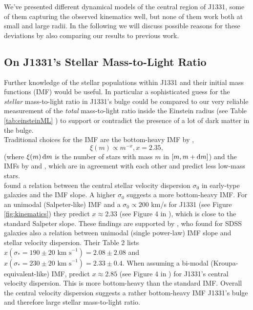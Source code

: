 We've presented different dynamical models of the central region of J1331, some of them capturing the observed kinematics well, but none of them work both at small and large radii. In the following we will discuss possible reasons for these deviations by also comparing our results to previous work.

\subsection{On J1331's Stellar Mass-to-Light Ratio} \label{sec:MLdiscussion}

Further knowledge of the stellar populations within J1331 and their initial mass functions (IMF) would be useful. In particular a sophisticated guess for the \emph{stellar} mass-to-light ratio in J1331's bulge could be compared to our very reliable measurement of the \emph{total} mass-to-light ratio inside the Einstein radius (see Table \ref{tab:einsteinML} ) to support or contradict the presence of a lot of dark matter in the bulge. \\

Traditional choices for the IMF are the bottom-heavy IMF by \citet{Salpeter1955},
$$\xi(m) \propto m^{-x}, x=2.35,$$
(where $\xi(m) \mathop{}\!\mathrm{d} m$ is the number of stars with mass $m$ in $[m,m+\mathop{}\!\mathrm{d} m]$) and the IMFs by \citet{2002Sci...295...82K} and \citet{Chabrier2003}, which are in agreement with each other and predict less low-mass stars. \\

\citet{Ferreras} found a relation between the central stellar velocity dispersion $\sigma_0$ in early-type galaxies and the IMF slope. A higher $\sigma_0$ suggests a more bottom-heavy IMF. For an unimodal (Salpeter-like) IMF and a $\sigma_0 \propto 200 $ km/s for J1331 (see Figure \ref{fig:kinematics}) they predict $x \approx 2.33$ (see Figure 4 in \citet{Ferreras}), which is close to the standard Salpeter slope. These findings are supported by \citet{2014MNRAS.438.1483S}, who found for SDSS galaxies also a relation between unimodal (single power-law) IMF slope and stellar velocity dispersion. Their Table 2 lists $x(\sigma_*=190 \pm 20 \text{ km s}^{-1}) = 2.08 \pm 2.08$ and $x(\sigma_*= 230 \pm 20 \text{ km s}^{-1}) = 2.33 \pm 0.4$. When assuming a bi-modal (Kroupa-equivalent-like) IMF, \citet{Ferreras} predict $x \approx 2.85$ (see Figure 4 in \citet{Ferreras}) for J1331's central velocity dispersion. This is more bottom-heavy than the standard \citet{2002Sci...295...82K} IMF. Overall the central velocity dispersion suggests a rather bottom-heavy IMF J1331's bulge and therefore large stellar mass-to-light ratio.\\

